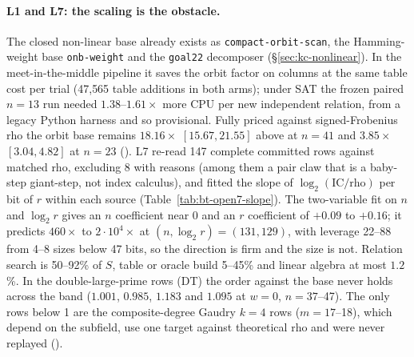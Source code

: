 \paragraph{L1 and L7: the scaling is the obstacle.} The closed non-linear
base already exists as \texttt{compact-orbit-scan}, the Hamming-weight base
\texttt{onb-weight} and the \texttt{goal22} decomposer
(\S\ref{sec:kc-nonlinear}). In the meet-in-the-middle pipeline it saves the
orbit factor on columns at the same table cost per trial (47{,}565 table
additions in both arms); under SAT the frozen paired $n=13$ run
needed $1.38$--$1.61\times$ more CPU per new independent relation, from a
legacy Python harness and so provisional. Fully priced against signed-Frobenius
rho the orbit base remains $18.16\times$ $[15.67,21.55]$ above at $n=41$ and
$3.85\times$ $[3.04,4.82]$ at $n=23$
(). L7
re-read 147 complete committed rows against matched rho, excluding 8 with
reasons (among them a pair claw that is a baby-step giant-step, not index
calculus), and fitted the slope of $\log_2(\text{IC}/\text{rho})$ per bit
of $r$ within each source (Table~\ref{tab:bt-open7-slope}). The two-variable
fit on $n$ and $\log_2r$ gives an $n$ coefficient near 0 and an $r$
coefficient of $+0.09$ to $+0.16$; it predicts $460\times$ to
$2\cdot10^4\times$ at $(n,\log_2r)=(131,129)$, with leverage 22--88 from
4--8 sizes below 47 bits, so the direction is firm and the size is not.
Relation search is 50--92\% of $S$, table or oracle build 5--45\% and linear
algebra at most $1.2$\%. In the double-large-prime rows (DT) the order
against the base never holds across the band ($1.001$, $0.985$, $1.183$ and
$1.095$ at $w=0$, $n=37$--47). The only rows below 1 are the composite-degree
Gaudry $k=4$ rows ($m=17$--18), which depend on the subfield, use one target
against theoretical rho and were never replayed
().

